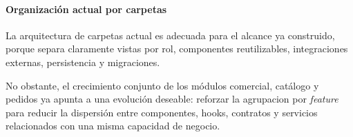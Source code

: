 \paragraph{Organización actual por carpetas}

La arquitectura de carpetas actual es adecuada para el alcance ya construido, porque separa claramente vistas por rol, componentes reutilizables, integraciones externas, persistencia y migraciones.

No obstante, el crecimiento conjunto de los módulos comercial, catálogo y pedidos ya apunta a una evolución deseable: reforzar la agrupacion por \textit{feature} para reducir la dispersión entre componentes, hooks, contratos y servicios relacionados con una misma capacidad de negocio.


